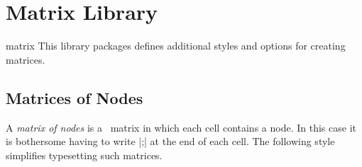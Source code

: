 %
%
%


\section{Matrix Library}

\begin{tikzlibrary}{matrix}
  This library packages defines additional styles and options for
  creating matrices.
\end{tikzlibrary}


\subsection{Matrices of Nodes}

A \emph{matrix of nodes} is a \tikzname\ matrix in which each cell
contains a node. In this case it is bothersome having to write
|;| at the end of each
cell. The following style simplifies typesetting such matrices.

